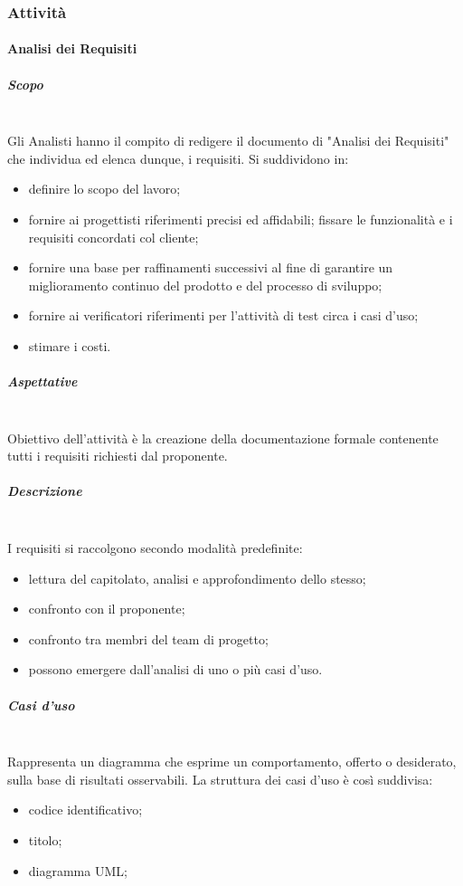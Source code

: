 \begin{itemize}
\subsubsection{Attività}
\paragraph{Analisi dei Requisiti}
\subparagraph{Scopo} \mbox{}\\
Gli Analisti hanno il compito di redigere il documento di
"Analisi dei Requisiti" che individua ed elenca dunque, i requisiti.
Si suddividono in:
\begin{itemize}
	\item definire lo scopo del lavoro;
	\item fornire ai progettisti riferimenti precisi ed affidabili;
	fissare le funzionalità e i requisiti concordati col cliente;
	\item fornire  una  base  per  raffinamenti  successivi  al  fine  di  garantire  un miglioramento continuo del prodotto e del processo di sviluppo;
	\item fornire ai verificatori riferimenti per l'attività di test circa i casi d'uso;
	\item stimare i costi.
\end{itemize}
\subparagraph{Aspettative} \mbox{}\\
Obiettivo dell'attività è la creazione della documentazione formale contenente tutti i
requisiti richiesti dal proponente.
\subparagraph{Descrizione} \mbox{}\\
I requisiti si raccolgono secondo modalità predefinite:
\begin{itemize}
	\item lettura del capitolato, analisi e approfondimento dello stesso;
	\item confronto con il proponente;
	\item confronto tra membri del team di progetto;
	\item possono emergere dall'analisi di uno o più casi d'uso.
\end{itemize}
\subparagraph{Casi d'uso} \mbox{}\\
Rappresenta un diagramma che esprime un comportamento,
offerto o desiderato, sulla base di risultati osservabili.
La struttura dei casi d'uso è così suddivisa:
\begin{itemize}
	\item codice identificativo;
	\item titolo;
	\item diagramma UML;

\end{itemize}
\end{itemize}
